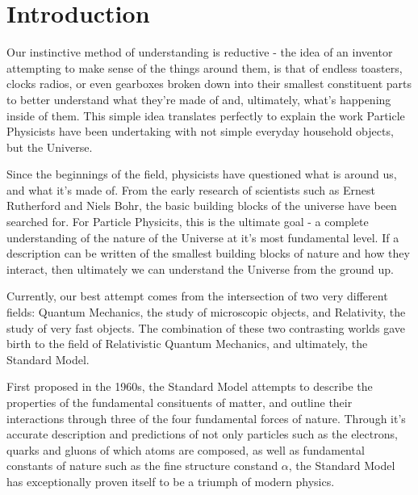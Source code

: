 
\chapter{Introduction}  %

\ifpdf
    \graphicspath{{Chapter1/Figs/Raster/}{Chapter1/Figs/PDF/}{Chapter1/Figs/}}
\else
    \graphicspath{{Chapter1/Figs/Vector/}{Chapter1/Figs/}}
\fi


\label{sec:introduction_intro}

Our instinctive method of understanding is reductive - the idea of an
inventor attempting to make sense of the things around them, is
that of endless toasters, clocks radios, or even gearboxes broken down into
their smallest constituent parts to better understand what they're made of and,
ultimately, what's happening inside of them. This simple idea translates
perfectly to explain the work Particle Physicists have been undertaking with
not simple everyday household objects, but the Universe.

Since the beginnings of the field, physicists have questioned
what is
around us, and what it's made of. From the early research of scientists such as
Ernest Rutherford and Niels Bohr, the basic building
blocks of the universe have been searched for. For Particle Physicits, this is
the ultimate goal - a complete understanding of the nature of the Universe
at it's most
fundamental level. If a description can be written of the smallest
building blocks of
nature and how they interact, then ultimately we can understand
the Universe from the ground up.

Currently, our best attempt comes from the intersection of two very different
fields: Quantum Mechanics, the study of microscopic objects, and Relativity, the
study of very fast objects. The combination of these
two contrasting worlds gave birth to the field of Relativistic
Quantum Mechanics, and ultimately, the Standard Model.

First proposed in the 1960s, the Standard Model attempts to describe the
properties of the fundamental consituents of matter, and outline their
interactions through three of the four fundamental forces of nature. Through
it's accurate description and predictions of not only particles such as
the electrons, quarks and gluons of which atoms are composed,
as well as fundamental constants of nature such as the fine structure constand
$\alpha$, the
Standard Model has exceptionally proven itself to be a triumph of
modern physics.

